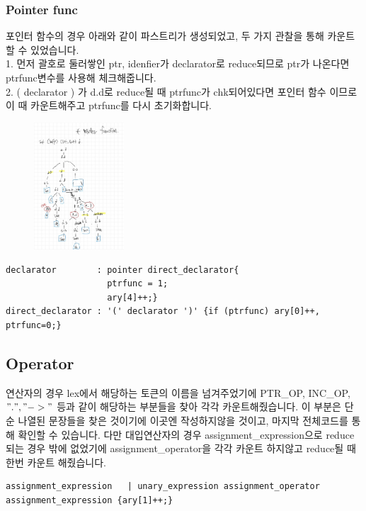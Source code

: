 \documentclass{article}
\begin{document}
        \subsubsection{Pointer func}
            포인터 함수의 경우 아래와 같이 파스트리가 생성되었고, 두 가지 관찰을 통해 카운트 할 수 있었습니다.\\
            1. 먼저 괄호로 둘러쌓인 ptr, idenfier가 declarator로 reduce되므로 ptr가 나온다면 ptrfunc변수를 사용해 체크해줍니다. \\
            2. ( declarator ) 가 d.d로 reduce될 때 ptrfunc가 chk되어있다면 포인터 함수 이므로 이 때 카운트해주고 ptrfunc를 다시 초기화합니다.\\
        \begin{figure}[h]
            \includegraphics[width = 0.3\textwidth]{ptrfun.jpg}
        \end{figure}
\newpage
\begin{verbatim}
declarator        : pointer direct_declarator{
                    ptrfunc = 1; 
                    ary[4]++;} 
direct_declarator : '(' declarator ')' {if (ptrfunc) ary[0]++, ptrfunc=0;}
\end{verbatim}     

        \subsection{Operator}
            연산자의 경우 lex에서 해당하는 토큰의 이름을 넘겨주었기에 PTR\_OP, INC\_OP, $".", "->"$ 등과 같이 해당하는 부분들을 찾아 각각 카운트해줬습니다. 
            이 부분은 단순 나열된 문장들을 찾은 것이기에 이곳엔 작성하지않을 것이고, 마지막 전체코드를 통해 확인할 수 있습니다.
            다만 대입연산자의 경우 assignment\_expression으로 reduce되는 경우 밖에 없었기에 assignment\_operator을 각각 카운트 하지않고 reduce될 때 한번 카운트 해줬습니다.
\begin{verbatim}
assignment_expression   | unary_expression assignment_operator assignment_expression {ary[1]++;}
\end{verbatim}   
\end{document}
